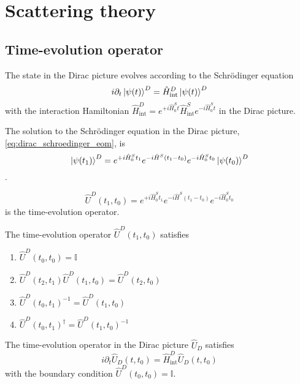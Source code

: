 \section{Scattering theory}

\subsection{Time-evolution operator}

\begin{lemma}\label{thm:dirac_schroedinger_eom}
	The state in the Dirac picture evolves according to the Schrödinger equation
	\begin{equation}
		i\partial_t
		\ket{\psi(t)}^D
		=
		\hat{H}_\text{int}^D
		\ket{\psi(t)}^D
		\label{eq:dirac_schroedinger_eom}
	\end{equation}
	with the interaction Hamiltonian $\hat{H}_\text{int}^D=e^{+i\hat{H}_0^St}\hat{H}_\text{int}^Se^{-i\hat{H}_0^St}$ in the Dirac picture.
\end{lemma}
\begin{theorem}
	The solution to the Schrödinger equation in the Dirac picture, \cref{eq:dirac_schroedinger_eom}, is
	\begin{equation}
		\ket{\psi(t_1)}^D
		=
		e^{+i\hat{H}_0^St_1}
		e^{-i\hat{H}^S(t_1-t_0)}
		e^{-i\hat{H}_0^St_0}
		\ket{\psi(t_0)}^D
	\end{equation}
	.
\end{theorem}
\begin{definition}
	\begin{equation}
		\hat{U}^D(t_1,t_0)
		=
		e^{+i\hat{H}_0^St_1}
		e^{-i\hat{H}^S(t_1-t_0)}
		e^{-i\hat{H}_0^St_0}		
	\end{equation}
	is the time-evolution operator.
\end{definition}
\begin{lemma}
	The time-evolution operator $\hat{U}^D(t_1,t_0)$ satisfies
	\begin{enumerate}
		\item $\hat{U}^D(t_0,t_0)=\mathbb{I}$
		\item $\hat{U}^D(t_2,t_1)\hat{U}^D(t_1,t_0)=\hat{U}^D(t_2,t_0)$
		\item $\hat{U}^D(t_0,t_1)^{-1}=\hat{U}^D(t_1,t_0)$
		\item $\hat{U}^D(t_0,t_1)^\dagger=\hat{U}^D(t_1,t_0)^{-1}$
	\end{enumerate}
\end{lemma}
\begin{corollary}
	The time-evolution operator in the Dirac picture $\hat{U}_D$ satisfies
	\begin{equation}
		i\partial_t
		\hat{U}_D(t,t_0)
		=
		\hat{H}^D_\text{int}
		\hat{U}_D(t,t_0)
		\label{eq:time_evolution_diff}
	\end{equation}
	with the boundary condition $\hat{U}^D(t_0,t_0)=\mathbb{I}$.
\end{corollary}
